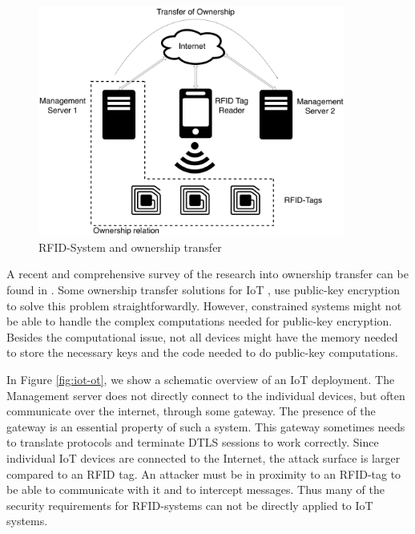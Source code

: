 \begin{figure}[ht]
\centering
\includegraphics[width=0.9\textwidth]{images/RFID-Tag_OT.pdf}
\caption{RFID-System and ownership transfer}
\label{fig:rfid-ot}
\end{figure}



A recent and comprehensive survey of the research into ownership transfer can be found in \cite{taqieddin2018tag}.
Some ownership transfer solutions for IoT \cite{tam2004protocol}, use public-key encryption to solve this problem straightforwardly. However, constrained systems might not be able to handle the complex computations needed for public-key encryption. Besides the computational issue, not all devices might have the memory needed to store the necessary keys and the code needed to do public-key computations.

In Figure \ref{fig:iot-ot}, we show a schematic overview of an IoT deployment. The Management server does not directly connect to the individual devices, but often communicate over the internet, through some gateway. The presence of the gateway is an essential property of such a system. This gateway sometimes needs to translate protocols and terminate DTLS sessions to work correctly. Since individual IoT devices are connected to the Internet, the attack surface is larger compared to an RFID tag. An attacker must be in proximity to an RFID-tag to be able to communicate with it and to intercept messages. Thus many of the security requirements for RFID-systems can not be directly applied to IoT systems.


